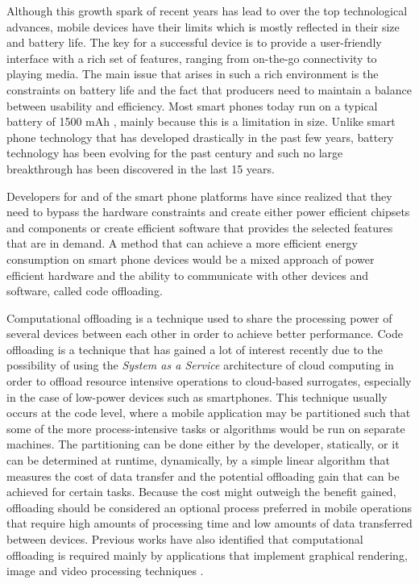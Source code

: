 Although this growth spark of recent years has lead to over the top technological advances, mobile devices have their limits which is mostly reflected in their size and battery life. The key for a successful device is to provide a user-friendly interface with a rich set of features, ranging from on-the-go connectivity to playing media. The main issue that arises in such a rich environment is the constraints on battery life and the fact that producers need to maintain a balance between usability and efficiency. Most smart phones today run on a typical battery of 1500 mAh \cite{ferreira2011understanding}, mainly because this is a limitation in size. Unlike smart phone technology that has developed drastically in the past few years, battery technology has been evolving for the past century and such no large breakthrough has been discovered in the last 15 years\cite{batteryLife}.


Developers for and of the smart phone platforms have since realized that they need to bypass the hardware constraints and create either power efficient chipsets and components or create efficient software that provides the selected features that are in demand. A method that can achieve a more efficient energy consumption on smart phone devices would be a mixed approach of power efficient hardware and the ability to communicate with other devices and software, called code offloading.


Computational offloading is a technique used to share the processing power of several devices between each other in order to achieve better performance. Code offloading is a technique that has gained a lot of interest recently due to the possibility of using the \textit{System as a Service} architecture of cloud computing in order to offload resource intensive operations to cloud-based surrogates\cite{shiraz2013review}, especially in the case of low-power devices such as smartphones. This technique usually occurs at the code level, where a mobile application may be partitioned such that some of the more process-intensive tasks or algorithms would be run on separate machines. The partitioning can be done either by the developer, statically, or it can be determined at runtime, dynamically, by a simple linear algorithm that measures the cost of data transfer and the potential offloading gain that can be achieved for certain tasks. Because the cost might outweigh the benefit gained, offloading should be considered an optional process preferred in mobile operations that require high amounts of processing time and low amounts of data transferred between devices\cite{kumar2010cloud}. Previous works have also identified that computational offloading is required mainly by applications that implement graphical rendering, image and video processing techniques\cite{cuervo2010maui} \cite{chun2011clonecloud}.

